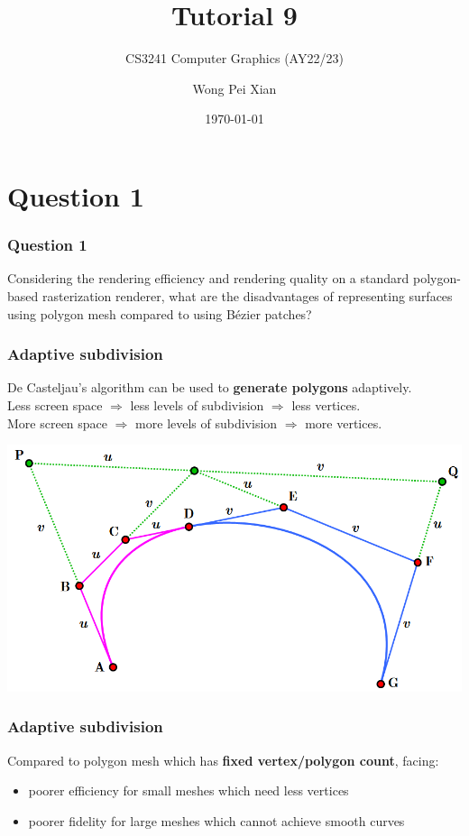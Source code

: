 \documentclass{beamer}
\title{Tutorial 9}
\subtitle{CS3241 Computer Graphics (AY22/23)}
\date{\today}
\author{Wong Pei Xian}
\institute[]{\email{e0389023@u.nus.edu}}
\begin{document}
\frame[plain]{\titlepage}


\section{Question 1}

\begin{frame}
    \frametitle{Question 1}
    Considering the rendering efficiency and rendering quality on a standard polygon-based rasterization 
    renderer, what are the disadvantages of representing surfaces using polygon mesh compared to using 
    Bézier patches?
\end{frame}

\begin{frame}
    \frametitle{Adaptive subdivision}

    De Casteljau's algorithm can be used to \textbf{generate polygons} adaptively.\\
    Less screen space $\Rightarrow$ less levels of subdivision $\Rightarrow$ less vertices.\\
    More screen space $\Rightarrow$ more levels of subdivision $\Rightarrow$ more vertices.\\

    \vspace{1em}

    \begin{center}
        \includegraphics[scale=0.4]{q1-adaptive-subdiv.png}
    \end{center}

\end{frame}

\begin{frame}
    \frametitle{Adaptive subdivision}

    Compared to polygon mesh which has \textbf{fixed vertex/polygon count}, facing:
    \begin{itemize}
        \item poorer efficiency for small meshes which need less vertices
        \item poorer fidelity for large meshes which cannot achieve smooth curves 
    \end{itemize}

\end{frame}
\end{document}
